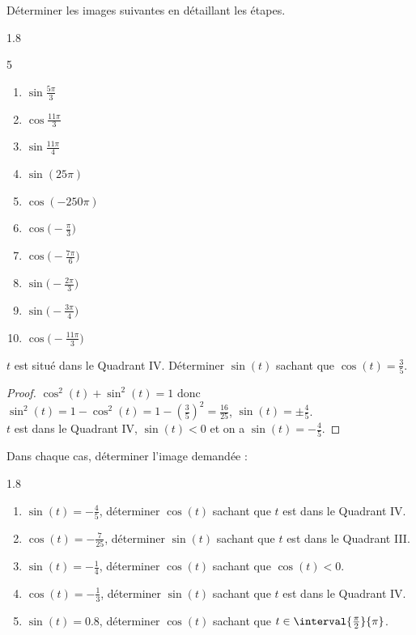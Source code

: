 \documentclass[main.tex]{subfiles}
\begin{document}
\begin{exercise}[\cancel{\faCalculator}]  Déterminer les images suivantes en détaillant les étapes.
\vspace{-1em}
\begin{spacing}{1.8}
\begin{multicols}{5} 
	\begin{enumerate}[label={\arabic*)},leftmargin=*]
		\item  $\sin \tfrac{5\pi}{3}$
		\item  $\cos \tfrac{11\pi}{3}$
		\item  $\sin \tfrac{11\pi}{4}$ 
		\item  $\sin (25\pi)$ 
		\item  $\cos (-250\pi)$ 
		\item  $\cos\big(-\tfrac{\pi}{3}\big) $
		\item  $\cos\big(-\tfrac{7\pi}{6}\big) $
		\item  $\sin\big(-\tfrac{2\pi}{3}\big) $
		\item  $\sin\big(-\tfrac{3\pi}{4}\big) $
		\item  $\cos\big(-\tfrac{11\pi}{3}\big) $
	\end{enumerate}
\end{multicols}\vspace{-2.5em}
\end{spacing}
\end{exercise}
\begin{example}[\cancel{\faCalculator}] $t$ est situé dans le Quadrant \RN{4}. Déterminer $\sin(t)$ sachant que $\cos(t)=\tfrac{3}{5}$.	
\end{example}
\begin{proof} $\cos^2(t)+\sin^2(t)=1$ donc $\sin^2(t)=1-\cos^2(t)=1-\left(\tfrac{3}{5}\right)^2=\tfrac{16}{25}$, $\sin(t)=\pm \tfrac{4}{5}$.\\
	$t$ est dans le Quadrant \RN{4}, $\sin(t)<0$ et on a $\sin(t)=-\tfrac{4}{5}$.
\end{proof}
\begin{exercise}[\cancel{\faCalculator}]  Dans chaque cas, déterminer l'image demandée :
\vspace{-0.5em}
\begin{spacing}{1.8} 
\begin{enumerate}[label={\arabic*)},leftmargin=*]
	\item  $\sin(t)=-\tfrac{4}{5}$, déterminer $\cos(t)$ sachant que $t$ est dans le Quadrant \RN{4}.
	\item $\cos(t)=-\tfrac{7}{25}$, déterminer $\sin(t)$ sachant que $t$ est dans le Quadrant \RN{3}.
	\item $\sin(t)=-\tfrac{1}{4}$, déterminer $\cos(t)$ sachant que  $\cos(t)<0$.
	\item  $\cos(t)=-\tfrac{1}{3}$, déterminer $\sin(t)$ sachant que $t$ est dans le Quadrant \RN{4}.
	\item $\sin(t)=0.8$, déterminer $\cos(t)$ sachant que $t\in\interval{\tfrac{\pi}{2}}{\pi}$.
\end{enumerate} \vspace{-1.5em}
\end{spacing}
\end{exercise}
\end{document}
